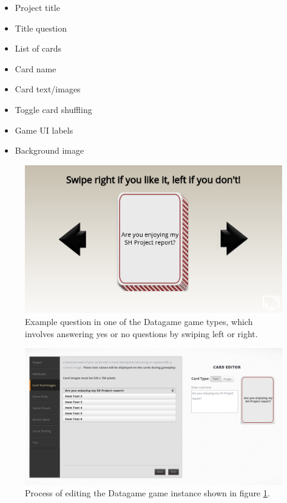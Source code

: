 \begin{itemize}
    \item Project title
    \item Title question
    \item List of cards
    \item Card name
    \item Card text/images
    \item Toggle card shuffling
    \item Game UI labels
    \item Background image
\end{itemize}

\begin{figure}[!h]
	\centering
	\includegraphics[width=1.0\textwidth]{./images/context/datagame.png}
	\caption{Example question in one of the Datagame\cite{Datagame} game types, which involves answering yes or no questions by swiping left or right.}
	\label{fig:datagame}
\end{figure}

\begin{figure}[!h]
	\centering
	\includegraphics[width=1.0\textwidth]{./images/context/dg_editor.png}
	\caption{Process of editing the Datagame\cite{Datagame} game instance shown in figure \ref{fig:datagame}. }
	\label{fig:dg_editor}
\end{figure}

